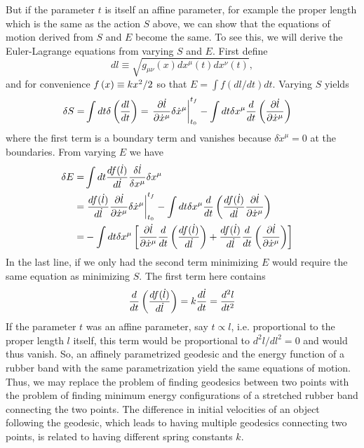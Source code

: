 \documentclass[nofootinbib,preprint,floatfix,titlepage,superscriptaddress]{revtex4} %
\begin{document}
But if the parameter $t$ is itself an affine parameter, for example the proper length which is the same as the action $S$ above, we can   show that the equations of motion derived from $S$ and $E$ become the same. To see this, we will derive the Euler-Lagrange equations from varying $S$ and $E$. First define
\[dl \equiv \sqrt{ g_{\mu\nu}(x)dx^\mu(t) dx^\nu(t)}, \]
and for convenience $f\left(x\right) \equiv {kx^2/ 2}$ so that $E = \int f(dl/dt) dt $. Varying $S$ yields
\begin{align}
    \delta S =& \int dt \delta \left({dl \over dt}\right) = \left.{\partial \dot{l} \over \partial \dot{x}^\mu} \delta \dot{x}^\mu\right|_{t_0}^{t_f} -\int dt \delta {x}^\mu  {d\over dt} \left({\partial \dot{l} \over \partial \dot{x}^\mu}\right) 
\end{align}
where the first term is a boundary term and vanishes because $\delta \dot{x}^\mu = 0 $ at the boundaries.  
From varying $E$ we have
\begin{align}
    \delta E =& \int dt {df(\dot{l}) \over d\dot{l}} {\delta \dot{l} \over \delta x^\mu} \delta x^\mu \cr
    =& \left.{df(\dot{l}) \over d\dot{l}}{\partial \dot{l} \over \partial \dot{x}^\mu} \delta \dot{x}^\mu\right|_{t_0}^{t_f} -\int dt \delta {x}^\mu  {d\over dt} \left({df(\dot{l}) \over d\dot{l}} {\partial \dot{l} \over \partial \dot{x}^\mu}\right) \cr
    =& -\int dt \delta {x}^\mu \left[ {\partial \dot{l} \over \partial \dot{x}^\mu} {d\over dt} \left({df(\dot{l}) \over d\dot{l}}\right) + {df(\dot{l}) \over d\dot{l}} {d\over dt} \left( {\partial \dot{l} \over \partial \dot{x}^\mu}\right)\right] 
\end{align}
In the last line, if we only had the second term minimizing $E$ would require the same equation as minimizing $S$. The first term here contains 
\[{d\over dt} \left({df(\dot{l}) \over d\dot{l}}\right) = k {d \dot{l}\over dt} ={d^2 l \over dt^2} \]
If the parameter $t$ was an affine parameter, say $ t\propto l$, i.e. proportional to the proper length $l$ itself, this term would be proportional to $d^2 l / dl^2 = 0$  and would thus vanish. So, an affinely parametrized geodesic and the energy function of a rubber band with the same parametrization yield the same equations of motion. Thus, we may replace the problem of finding geodesics between two points with the problem of finding minimum energy configurations of a stretched rubber band connecting the two points. 
The difference in initial velocities of an object following the geodesic, which leads to having multiple geodesics connecting two points, is related to having different spring constants $k$. %
\end{document}
